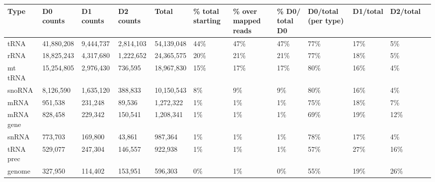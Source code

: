 \documentclass[12pt]{rockefeller}
\begin{document}
\begin{table}[h!]
  \begin{adjustbox}{max width = \textwidth}
  \def\arraystretch{1.5}
  \tabulinesep=1.2mm  

  \begin{tabular}{|l|l|l|l|l|l|l|l|l|l|l|l}
\hline
           Type &   D0 counts &   D1 counts &  D2 counts &        Total & \multicolumn{1}{m{2.5cm}|}{\% total starting}  & \multicolumn{1}{m{2cm}|}{\% over mapped reads}  & \multicolumn{1}{m{2.5cm}|}{\% D0/ total D0} & \multicolumn{1}{m{2cm}|}{D0/total (per type)} & D1/total & D2/total \\
\hline
           tRNA &  41,880,208 &   9,444,737 &  2,814,103 &   54,139,048 &               44\% &                  47\% &            47\% &                 77\% &      17\% &       5\% \\
           rRNA &  18,825,243 &   4,317,680 &  1,222,652 &   24,365,575 &               20\% &                  21\% &            21\% &                 77\% &      18\% &       5\% \\
        mt tRNA &  15,254,805 &   2,976,430 &    736,595 &   18,967,830 &               15\% &                  17\% &            17\% &                 80\% &      16\% &       4\% \\
         snoRNA &   8,126,590 &   1,635,120 &    388,833 &   10,150,543 &                8\% &                   9\% &             9\% &                 80\% &      16\% &       4\% \\
           mRNA &     951,538 &     231,248 &     89,536 &    1,272,322 &                1\% &                   1\% &             1\% &                 75\% &      18\% &       7\% \\
      mRNA gene &     828,458 &     229,342 &    150,541 &    1,208,341 &                1\% &                   1\% &             1\% &                 69\% &      19\% &      12\% \\
          snRNA &     773,703 &     169,800 &     43,861 &      987,364 &                1\% &                   1\% &             1\% &                 78\% &      17\% &       4\% \\
      tRNA prec &     529,077 &     247,304 &    146,557 &      922,938 &                1\% &                   1\% &             1\% &                 57\% &      27\% &      16\% \\
         genome &     327,950 &     114,402 &    153,951 &      596,303 &                0\% &                   1\% &             0\% &                 55\% &      19\% &      26\% \\

\end{tabular}
\end{adjustbox}
\end{table}
\end{document}
